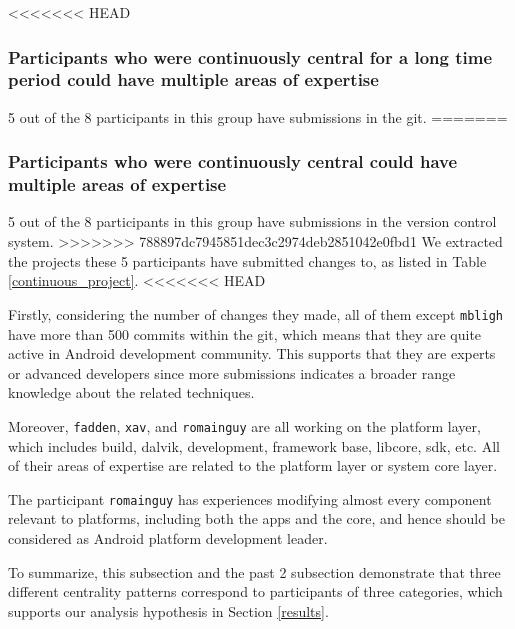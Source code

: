 \documentclass[conference]{IEEEtran}
\begin{document}

<<<<<<< HEAD
\subsubsection{Participants who were continuously central for a long time period could have multiple areas of expertise}

5 out of the 8 participants in this group have submissions in the
git.
=======
\subsubsection{Participants who were continuously central could have multiple areas of expertise}

5 out of the 8 participants in this group have submissions in the
version control system.
>>>>>>> 788897dc7945851dec3c2974deb2851042e0fbd1
We extracted the projects these 5 participants have submitted changes
to, as listed in Table \ref{continuous_project}.
<<<<<<< HEAD


Firstly, considering the number of changes they made, all of them
except \texttt{mbligh} have more than 500 commits within the
git,
which means that they are quite active in Android
development community. This supports that they are
experts or advanced developers since more submissions indicates a
 broader range knowledge about the related techniques.


Moreover, \texttt{fadden}, \texttt{xav}, and \texttt{romainguy} are
all working on the platform layer,
which includes build, dalvik, development, framework base, libcore,
sdk, etc. All of their areas of expertise are related to the platform layer or
system core layer.

The participant \texttt{romainguy} has experiences modifying almost every
component relevant to platforms, including both the apps and the core, and
hence should be considered as Android platform development leader.


To summarize, this subsection and the past 2 subsection demonstrate
that three different centrality patterns correspond to
participants of three categories, which supports our analysis hypothesis
in Section \ref{results}.
\end{document}
